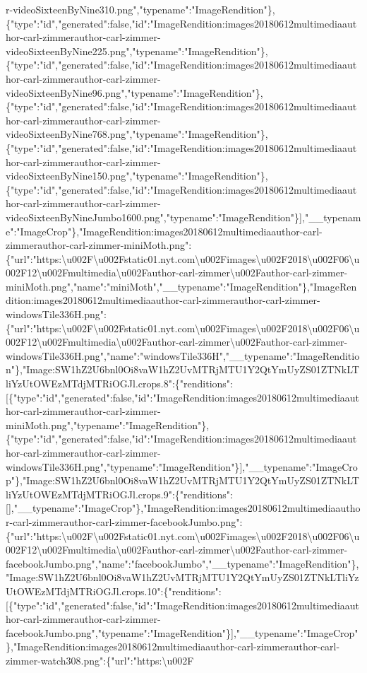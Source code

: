 r-videoSixteenByNine310.png","typename":"ImageRendition"\},\{"type":"id","generated":false,"id":"ImageRendition:images20180612multimediaauthor-carl-zimmerauthor-carl-zimmer-videoSixteenByNine225.png","typename":"ImageRendition"\},\{"type":"id","generated":false,"id":"ImageRendition:images20180612multimediaauthor-carl-zimmerauthor-carl-zimmer-videoSixteenByNine96.png","typename":"ImageRendition"\},\{"type":"id","generated":false,"id":"ImageRendition:images20180612multimediaauthor-carl-zimmerauthor-carl-zimmer-videoSixteenByNine768.png","typename":"ImageRendition"\},\{"type":"id","generated":false,"id":"ImageRendition:images20180612multimediaauthor-carl-zimmerauthor-carl-zimmer-videoSixteenByNine150.png","typename":"ImageRendition"\},\{"type":"id","generated":false,"id":"ImageRendition:images20180612multimediaauthor-carl-zimmerauthor-carl-zimmer-videoSixteenByNineJumbo1600.png","typename":"ImageRendition"\}{]},"\_\_typename":"ImageCrop"\},"ImageRendition:images20180612multimediaauthor-carl-zimmerauthor-carl-zimmer-miniMoth.png":\{"url":"https:\textbackslash{}u002F\textbackslash{}u002Fstatic01.nyt.com\textbackslash{}u002Fimages\textbackslash{}u002F2018\textbackslash{}u002F06\textbackslash{}u002F12\textbackslash{}u002Fmultimedia\textbackslash{}u002Fauthor-carl-zimmer\textbackslash{}u002Fauthor-carl-zimmer-miniMoth.png","name":"miniMoth","\_\_typename":"ImageRendition"\},"ImageRendition:images20180612multimediaauthor-carl-zimmerauthor-carl-zimmer-windowsTile336H.png":\{"url":"https:\textbackslash{}u002F\textbackslash{}u002Fstatic01.nyt.com\textbackslash{}u002Fimages\textbackslash{}u002F2018\textbackslash{}u002F06\textbackslash{}u002F12\textbackslash{}u002Fmultimedia\textbackslash{}u002Fauthor-carl-zimmer\textbackslash{}u002Fauthor-carl-zimmer-windowsTile336H.png","name":"windowsTile336H","\_\_typename":"ImageRendition"\},"Image:SW1hZ2U6bnl0Oi8vaW1hZ2UvMTRjMTU1Y2QtYmUyZS01ZTNkLTliYzUtOWEzMTdjMTRiOGJl.crops.8":\{"renditions":{[}\{"type":"id","generated":false,"id":"ImageRendition:images20180612multimediaauthor-carl-zimmerauthor-carl-zimmer-miniMoth.png","typename":"ImageRendition"\},\{"type":"id","generated":false,"id":"ImageRendition:images20180612multimediaauthor-carl-zimmerauthor-carl-zimmer-windowsTile336H.png","typename":"ImageRendition"\}{]},"\_\_typename":"ImageCrop"\},"Image:SW1hZ2U6bnl0Oi8vaW1hZ2UvMTRjMTU1Y2QtYmUyZS01ZTNkLTliYzUtOWEzMTdjMTRiOGJl.crops.9":\{"renditions":{[}{]},"\_\_typename":"ImageCrop"\},"ImageRendition:images20180612multimediaauthor-carl-zimmerauthor-carl-zimmer-facebookJumbo.png":\{"url":"https:\textbackslash{}u002F\textbackslash{}u002Fstatic01.nyt.com\textbackslash{}u002Fimages\textbackslash{}u002F2018\textbackslash{}u002F06\textbackslash{}u002F12\textbackslash{}u002Fmultimedia\textbackslash{}u002Fauthor-carl-zimmer\textbackslash{}u002Fauthor-carl-zimmer-facebookJumbo.png","name":"facebookJumbo","\_\_typename":"ImageRendition"\},"Image:SW1hZ2U6bnl0Oi8vaW1hZ2UvMTRjMTU1Y2QtYmUyZS01ZTNkLTliYzUtOWEzMTdjMTRiOGJl.crops.10":\{"renditions":{[}\{"type":"id","generated":false,"id":"ImageRendition:images20180612multimediaauthor-carl-zimmerauthor-carl-zimmer-facebookJumbo.png","typename":"ImageRendition"\}{]},"\_\_typename":"ImageCrop"\},"ImageRendition:images20180612multimediaauthor-carl-zimmerauthor-carl-zimmer-watch308.png":\{"url":"https:\textbackslash{}u002F\te